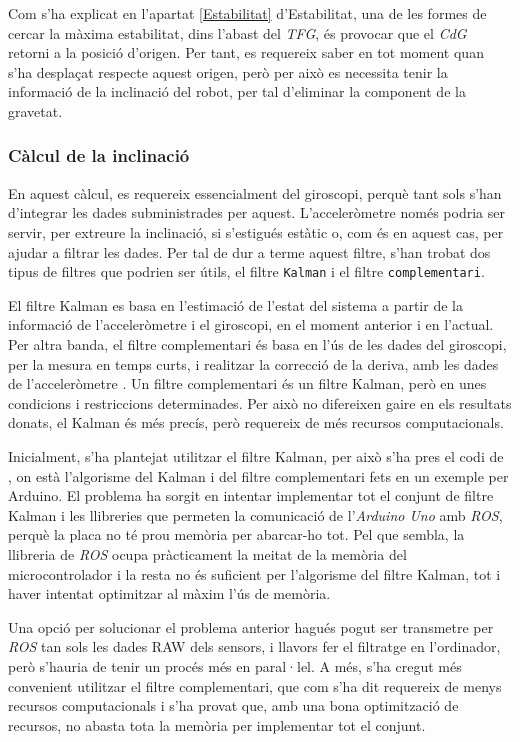 \documentclass[12pt,a4paper,final,twoside]{report}
\begin{document}
Com s'ha explicat en l'apartat \ref{Estabilitat} d'Estabilitat, una de les formes de cercar la màxima estabilitat, dins l'abast del \textit{TFG}, és provocar que el \textit{CdG} retorni a la posició d'origen. Per tant, es requereix saber en tot moment quan s'ha desplaçat respecte aquest origen, però per això es necessita tenir la informació de la inclinació del robot, per tal d'eliminar la component de la gravetat.


\subsubsection{Càlcul de la inclinació}

En aquest càlcul, es requereix essencialment del giroscopi, perquè tant sols s'han d'integrar les dades subministrades per aquest. L'acceleròmetre només podria ser servir, per extreure la inclinació, si s'estigués estàtic o, com és en aquest cas, per ajudar a filtrar les dades. Per tal de dur a terme aquest filtre, s'han trobat dos tipus de filtres que podrien ser útils, el filtre \texttt{Kalman} i el filtre \texttt{complementari}.

El filtre Kalman es basa en l'estimació de l'estat del sistema a partir de la informació de l'acceleròmetre i el giroscopi, en el moment anterior i en l'actual. Per altra banda, el filtre complementari és basa en l'ús de les dades del giroscopi, per la mesura en temps curts, i realitzar la correcció de la deriva, amb les dades de l'acceleròmetre \cite{Gaydou2011}. Un filtre complementari és un filtre Kalman, però en unes condicions i restriccions determinades. Per això no difereixen gaire en els resultats donats, el Kalman és més precís, però requereix de més recursos computacionals.

Inicialment, s'ha plantejat utilitzar el filtre Kalman, per això s'ha pres el codi de \cite{Lauszus2012}, on està l'algorisme del Kalman i del filtre complementari fets en un exemple per Arduino. El problema ha sorgit en intentar implementar tot el conjunt de filtre Kalman i les llibreries que permeten la comunicació de l'\textit{Arduino Uno} amb \textit{ROS}, perquè la placa no té prou memòria per abarcar-ho tot. Pel que sembla, la llibreria de \textit{ROS} ocupa pràcticament la meitat de la memòria del microcontrolador i la resta no és suficient per l'algorisme del filtre Kalman, tot i haver intentat optimitzar al màxim l'ús de memòria.

Una opció per solucionar el problema anterior hagués pogut ser transmetre per \textit{ROS} tan sols les dades RAW dels sensors, i llavors fer el filtratge en l'ordinador, però s'hauria de tenir un procés més en paral·lel. A més, s'ha cregut més convenient utilitzar el filtre complementari, que com s'ha dit requereix de menys recursos computacionals i s'ha provat que, amb una bona optimització de recursos, no abasta tota la memòria per implementar tot el conjunt.
\end{document}
